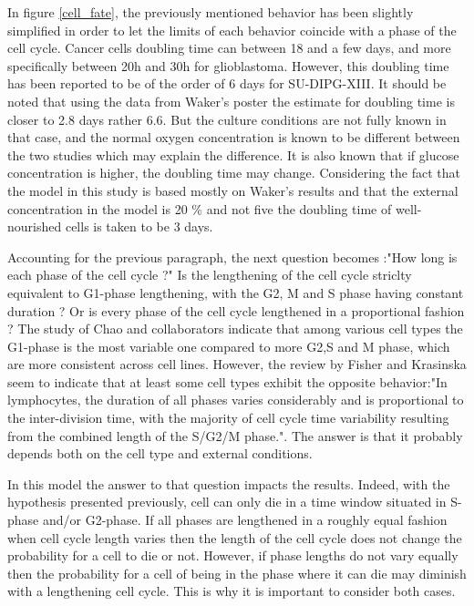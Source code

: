 \documentclass[11pt,a4paper]{article}
\begin{document}
In figure \ref{cell_fate}, the previously mentioned behavior has been slightly simplified in order to let the limits of each behavior coincide with a phase of the cell cycle. Cancer cells doubling time can between 18 and a few days, and more specifically between 20h and 30h for glioblastoma.\cite{Oraiopoulou2017} However, this doubling time has been reported to be of the order of 6 days for SU-DIPG-XIII.\cite{He2021} It should be noted that using the data from Waker's poster the estimate for doubling time is closer to 2.8 days rather 6.6. But the culture conditions are not fully known in that case, and the normal oxygen concentration is known to be different between the two studies which may explain the difference. It is also known that if glucose concentration is higher, the doubling time may change.\cite{Casciari1992}\cite{Yang2021} Considering the fact that the model in this study is based mostly on Waker's results and that the external concentration in the model is 20 \% and not five the doubling time of well-nourished cells is taken to be 3 days.

Accounting for the previous paragraph, the next question becomes :"How long is each phase of the cell cycle ?" Is the lengthening of the cell cycle striclty equivalent to G1-phase lengthening, with the G2, M and S phase having constant duration ? Or is every phase of the cell cycle lengthened in a proportional fashion ? The study of Chao and collaborators indicate that among various cell types the G1-phase is the most variable one compared to more G2,S and M phase, which are more consistent across cell lines.\cite{Chao2019} However, the review by Fisher and Krasinska seem to indicate that at least some cell types exhibit the opposite behavior:"In lymphocytes, the duration of all phases varies considerably and is proportional to the inter-division time, with the majority of cell cycle time variability resulting from the combined length of the S/G2/M phase."\cite{Fisher2022}. The answer is that it probably depends both on the cell type and external conditions.

In this model the answer to that question impacts the results. Indeed, with the hypothesis presented previously, cell can only die in a time window situated in S-phase and/or G2-phase. If all phases are lengthened in a roughly equal fashion when cell cycle length varies then the length of the cell cycle does not change the probability for a cell to die or not. However, if phase lengths do not vary equally then the probability for a cell of being in the phase where it can die may diminish with a lengthening cell cycle. This is why it is important to consider both cases.
\end{document}
